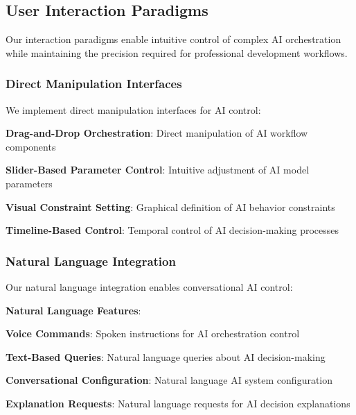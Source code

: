 \subsection*{User Interaction Paradigms}

Our interaction paradigms enable intuitive control of complex AI orchestration while maintaining the precision required for professional development workflows.

\subsubsection*{Direct Manipulation Interfaces}

We implement direct manipulation interfaces for AI control:

\begin{compactlist}
    \item \textbf{Drag-and-Drop Orchestration}: Direct manipulation of AI workflow components
    \item \textbf{Slider-Based Parameter Control}: Intuitive adjustment of AI model parameters
    \item \textbf{Visual Constraint Setting}: Graphical definition of AI behavior constraints
    \item \textbf{Timeline-Based Control}: Temporal control of AI decision-making processes
\end{compactlist}

\subsubsection*{Natural Language Integration}

Our natural language integration enables conversational AI control:

\begin{alertbox}
\textbf{Natural Language Features}:
\begin{compactlist}
    \item \textbf{Voice Commands}: Spoken instructions for AI orchestration control
    \item \textbf{Text-Based Queries}: Natural language queries about AI decision-making
    \item \textbf{Conversational Configuration}: Natural language AI system configuration
    \item \textbf{Explanation Requests}: Natural language requests for AI decision explanations
\end{compactlist}
\end{alertbox}

